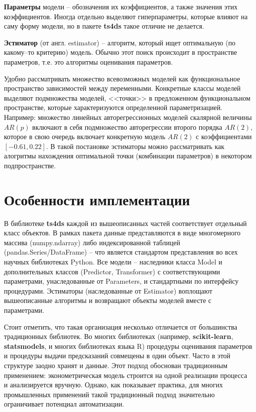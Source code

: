 \documentclass[a4paper,14pt]{extreport}
\begin{document}
	\textbf{Параметры} модели – обозначения их коэффициентов, а также значения этих коэффициентов. Иногда отдельно выделяют гиперпараметры, которые влияют на саму форму модели, но в пакете \textbf{ts4ds} такое отличие не делается.
	
	\textbf{Эстиматор} (от англ. estimator) – алгоритм, который ищет оптимальную (по какому–то критерию) модель. Обычно этот поиск происходит в пространстве параметров, т.е. это алгоритмы оценивания параметров.
	
	Удобно рассматривать множество всевозможных моделей как функциональное пространство зависимостей между переменными. Конкретные классы моделей выделяют подмножества моделей, <<точки>> в предложенном функциональном пространстве, которые характеризуются определенной параметризацией. Например: множество линейных авторегрессионных моделей скалярной величины $AR(p)$ включают в себя подмножество авторегрессии второго порядка $AR(2)$, которое в свою очередь включает конкретную модель $AR(2)$ с коэффициентами $[-0.61, 0.22]$. В такой постановке эстиматоры можно рассматривать как алогритмы нахождения оптимальной точки (комбинации параметров) в некотором подпространстве.
	
	\section{Особенности имплементации}
	
	В библиотеке \textbf{ts4ds} каждой из вышеописанных частей соответствует отдельный класс объектов. В рамках пакета данные представляются в виде многомерного массива (numpy.ndarray) либо индексированной таблицей (pandas.Series/DataFrame) – что является стандартом представления во всех научных библиотеках Python. Все модели – наследники класса Model и дополнительных классов (Predictor, Transformer) с соответствующими параметрами, унаследованные от Parameters, и стандартными по интерфейсу процедурами. Эстиматоры (наследованные от Estimator) воплощают вышеописанные алгоритмы и возвращают объекты моделей вместе с параметрами.
	
	Стоит отметить, что такая организация несколько отличается от большинства традиционных библиотек. Во многих библиотеках (например, \textbf{scikit-learn}, \textbf{statsmodels}\cite{statsmodels}, и многих библиотеках языка R) процедуры оценивания параметров и процедуры выдачи предсказаний совмещены в один объект. Часто в этой структуре заодно хранят и данные. Этот подход обоснован традиционным применением: эконометрическая модель строится на одной  реализации процесса и анализируется вручную. Однако, как показывает практика, для многих промышленных применений такой традиционный подход значительно ограничивает потенциал автоматизации. 
	
\end{document}

